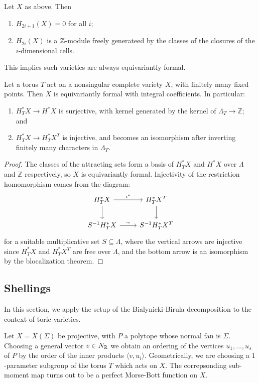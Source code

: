 \begin{cor}
	Let $X$ as above. Then \begin{enumerate}
		\item $H_{2i+1}(X) = 0$ for all $i$;
		\item $H_{2i}(X)$ is a $\mathbb{Z}$-module freely generateed by the classes
		      of the closures of the $i$-dimensional cells.
	\end{enumerate}
\end{cor} This implies such varieties are always equivariantly formal.
\begin{cor}
	Let a torus \( T \) act on a nonsingular complete variety \( X \), with finitely many fixed points. Then \( X \) is equivariantly formal with integral coefficients. In particular:
	\begin{enumerate}
		\item \( H_T^* X \to H^* X \) is surjective, with kernel generated by the kernel of \( \Lambda_T \to \mathbb{Z} \); and
		\item \( H_T^* X \to H_T^* X^T \) is injective, and becomes an isomorphism after inverting finitely many characters in \( \Lambda_T \).
	\end{enumerate}
\end{cor}

\begin{proof}
	The classes of the attracting sets form a basis of \( H_T^* X \) and \( H^* X \) over \( \Lambda \) and \( \mathbb{Z} \) respectively, so \( X \) is equivariantly formal. Injectivity of the restriction homomorphism comes from the diagram:
	\[
		\begin{tikzcd}
			H_T^* X \arrow[r, "\iota^*"] \arrow[d] & H_T^* X^T \arrow[d] \\
			S^{-1} H_T^* X \arrow[r, "\sim"]       & S^{-1} H_T^* X^T
		\end{tikzcd}
	\]
	for a suitable multiplicative set \( S \subseteq \Lambda \), where the vertical arrows are injective since \( H_T^* X \) and \( H_T^* X^T \) are free over \( \Lambda \), and the bottom arrow is an isomorphism by the blocalization theorem.
\end{proof}

\subsection{Shellings}
In this section, we apply the setup of the Bialynicki-Birula decomposition to the context of toric varieties.

Let $X = X(\Sigma)$ be projective, with $P$
a polytope whose normal fan is $\Sigma$. Choosing
a general vector $v\in N_{\mathbb{R}}$ we obtain an ordering of the vertices
$u_1,\ldots,u_s$ of $P$ by the order of the inner products $\langle v,u_i\rangle$.
Geometrically, we are choosing a $1$-parameter subgroup of the torus $T$
which acts on $X$. The correpsonding sub-moment map turns out to be
a perfect Morse-Bott function on $X$.

